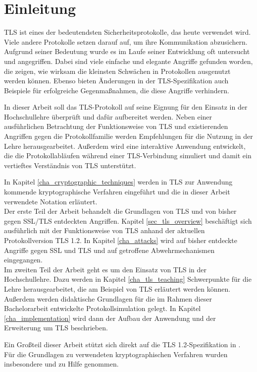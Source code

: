 \chapter{Einleitung}


TLS ist eines der bedeutendsten Sicherheitsprotokolle, das heute verwendet wird. Viele andere Protokolle setzen darauf auf, um ihre Kommunikation abzusichern. Aufgrund seiner Bedeutung wurde es im Laufe seiner Entwicklung oft untersucht und angegriffen. Dabei sind viele einfache und elegante Angriffe gefunden worden, die zeigen, wie wirksam die kleinsten Schwächen in Protokollen ausgenutzt werden können. Ebenso bieten Änderungen in der TLS-Spezifikation auch Beispiele für erfolgreiche Gegenmaßnahmen, die diese Angriffe verhindern.


In dieser Arbeit soll das TLS-Protokoll auf seine Eignung für den Einsatz in der Hochschullehre überprüft und dafür aufbereitet werden. 
Neben einer ausführlichen Betrachtung der Funktionsweise von TLS und existierenden Angriffen gegen die Protokollfamilie werden Empfehlungen für die Nutzung in der Lehre herausgearbeitet. Außerdem wird eine interaktive Anwendung entwickelt, die die Protokollabläufen während einer TLS-Verbindung simuliert und damit ein vertieftes Verständnis von TLS unterstützt.

In Kapitel \ref{cha_cryptographic_techniques} werden in TLS zur Anwendung kommende kryptographische Verfahren eingeführt und die in dieser Arbeit verwendete Notation erläutert. \\
Der erste Teil der Arbeit behandelt die Grundlagen von TLS und von bisher gegen SSL/TLS entdeckten Angriffen. Kapitel \ref{sec_tls_overview} beschäftigt sich ausführlich mit der Funktionsweise von TLS anhand der aktuellen Protokollversion TLS 1.2. In Kapitel \ref{cha_attacks} wird auf bisher entdeckte Angriffe gegen SSL und TLS und auf getroffene Abwehrmechanismen eingegangen.\\
Im zweiten Teil der Arbeit geht es um den Einsatz von TLS in der Hochschullehre. Dazu werden in Kapitel \ref{cha_tls_teaching} Schwerpunkte für die Lehre herausgearbeitet, die am Beispiel von TLS erläutert werden können. Außerdem werden didaktische Grundlagen für die im Rahmen dieser Bachelorarbeit entwickelte Protokollsimulation gelegt. In Kapitel \ref{cha_implementation} wird dann der Aufbau der Anwendung und der Erweiterung um TLS beschrieben.

Ein Großteil dieser Arbeit stützt sich direkt auf die TLS 1.2-Spezifikation in \cite{tls12}. Für die Grundlagen zu verwendeten kryptographischen Verfahren wurden insbesondere \cite{Schneier2006} und \cite{ferguson10} zu Hilfe genommen. 

